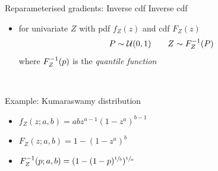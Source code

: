 \begin{frame}{Reparameterised gradients: Inverse cdf}
	Inverse cdf
	\begin{itemize}
		\item for univariate $Z$ with pdf $f_Z(z)$ and cdf $F_Z(z)$
		\begin{equation*}
		\begin{aligned}
			P \sim \mathcal U(0, 1) \qquad Z \sim {F}^{-1}_Z(P) 
		\end{aligned}		
		\end{equation*}
		where ${F}^{-1}_Z(p)$ is the \emph{quantile function}
	\end{itemize}
	
	~ \pause
	
	Example: Kumaraswamy distribution
	\begin{itemize}
		\item $f_Z(z; a, b) = abz^{a-1}(1-z^a)^{b-1}$ 
		\item $F_Z(z; a, b) = 1 - (1 - z^a)^b$
		\item ${F}^{-1}_Z(p; a, b) = (1 - (1 - p)^{\sfrac{1}{b}})^{\sfrac{1}{a}}$
	\end{itemize}
\end{frame}

